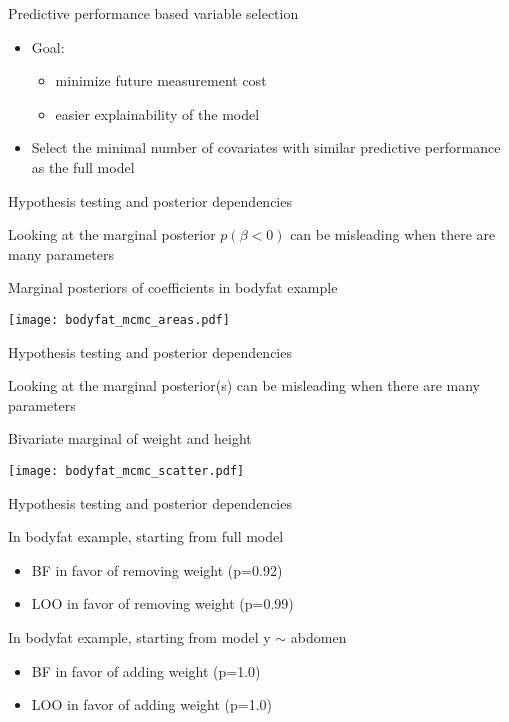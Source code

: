\documentclass[english,t]{beamer}
\begin{document}
\begin{frame}{Predictive performance based variable selection}

  \begin{itemize}
  \item Goal:
    \begin{itemize}
    \item minimize future measurement cost
    \item easier explainability of the model
    \end{itemize}
  \item<2-> Select the minimal number of covariates with similar
    predictive performance as the full model
  \end{itemize}

\end{frame}

\begin{frame}{Hypothesis testing and posterior dependencies}

  \vspace{-0.5\baselineskip}
  Looking at the marginal posterior $p(\beta < 0)$ can be misleading when there
  are many parameters
  
  Marginal posteriors of coefficients in bodyfat example
  
  \texttt{[image: bodyfat\_mcmc\_areas.pdf]}

\end{frame}

\begin{frame}{Hypothesis testing and posterior dependencies}

  \vspace{-0.75\baselineskip}
  Looking at the marginal posterior(s) can be misleading when there
  are many parameters

  Bivariate marginal of weight and height
  
  \vspace{-0.25\baselineskip}
  \texttt{[image: bodyfat\_mcmc\_scatter.pdf]}

\end{frame}

\begin{frame}{Hypothesis testing and posterior dependencies}

  In bodyfat example, starting from full model

  \begin{itemize}
  \item BF in favor of removing weight (p=0.92)
  \item LOO in favor of removing weight (p=0.99)
  \end{itemize}

  In bodyfat example, starting from model y $\sim$ abdomen
  \begin{itemize}
  \item BF in favor of adding weight (p=1.0)
  \item LOO in favor of adding weight (p=1.0)
  \end{itemize}

\end{frame}
\end{document}
